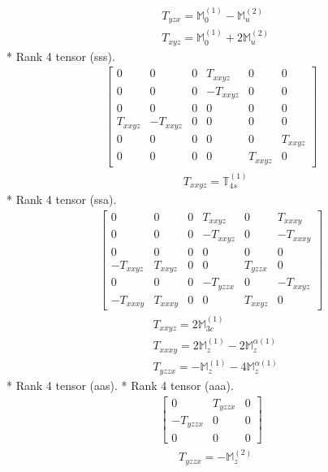 \documentclass[fleqn,8pt,landscape]{jsarticle}
\begin{document}
\begin{align*}
& T_{yzx} = \mathbb{M}_{0}^{(1)} - \mathbb{M}_{u}^{(2)} \\
& T_{xyz} = \mathbb{M}_{0}^{(1)} + 2 \mathbb{M}_{u}^{(2)}
\end{align*}
* Rank 4 tensor (sss).
\begin{align*}
\begin{bmatrix} 0 & 0 & 0 & T_{xxyz} & 0 & 0 \\ 0 & 0 & 0 & - T_{xxyz} & 0 & 0 \\ 0 & 0 & 0 & 0 & 0 & 0 \\ T_{xxyz} & - T_{xxyz} & 0 & 0 & 0 & 0 \\ 0 & 0 & 0 & 0 & 0 & T_{xxyz} \\ 0 & 0 & 0 & 0 & T_{xxyz} & 0 \end{bmatrix}
\end{align*}
\begin{align*}
& T_{xxyz} = \mathbb{T}_{4s}^{(1)}
\end{align*}
* Rank 4 tensor (ssa).
\begin{align*}
\begin{bmatrix} 0 & 0 & 0 & T_{xxyz} & 0 & T_{xxxy} \\ 0 & 0 & 0 & - T_{xxyz} & 0 & - T_{xxxy} \\ 0 & 0 & 0 & 0 & 0 & 0 \\ - T_{xxyz} & T_{xxyz} & 0 & 0 & T_{yzzx} & 0 \\ 0 & 0 & 0 & - T_{yzzx} & 0 & - T_{xxyz} \\ - T_{xxxy} & T_{xxxy} & 0 & 0 & T_{xxyz} & 0 \end{bmatrix}
\end{align*}
\begin{align*}
& T_{xxyz} = 2 \mathbb{M}_{3c}^{(1)} \\
& T_{xxxy} = 2 \mathbb{M}_{z}^{(1)} - 2 \mathbb{M}_{z}^{\alpha(1)} \\
& T_{yzzx} = - \mathbb{M}_{z}^{(1)} - 4 \mathbb{M}_{z}^{\alpha(1)}
\end{align*}
* Rank 4 tensor (aas).
* Rank 4 tensor (aaa).
\begin{align*}
\begin{bmatrix} 0 & T_{yzzx} & 0 \\ - T_{yzzx} & 0 & 0 \\ 0 & 0 & 0 \end{bmatrix}
\end{align*}
\begin{align*}
& T_{yzzx} = - \mathbb{M}_{z}^{(2)}
\end{align*}
\end{document}
